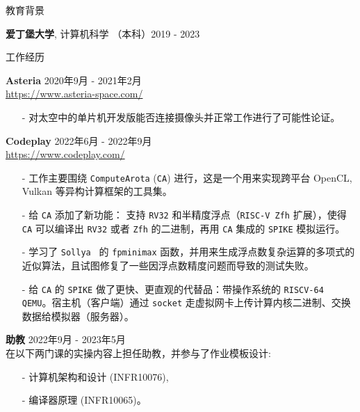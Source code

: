\documentclass{resume} %
\newcommand{\itemsepval}{-6pt}
\newcommand{\code}{\texttt}
\begin{document}
\begin{rSection}{教育背景}

{\bf  爱丁堡大学}, 计算机科学 （本科）\hfill {2019 - 2023}

\end{rSection}

\begin{rSection}{工作经历}

    \textbf{Asteria} \hfill 2020年9月 - 2021年2月  \\
    \url{https://www.asteria-space.com/} \hfill \par
    \begin{itemize}
        \itemsep \itemsepval {} 
        \item[-] 对太空中的单片机开发版能否连接摄像头并正常工作进行了可能性论证。
    \end{itemize}
     
    \textbf{Codeplay} \hfill 2022年6月 - 2022年9月 \\
    \url{https://www.codeplay.com/} \hfill \par
    \begin{itemize}
        \itemsep \itemsepval {} 
        \item[-] 工作主要围绕 \code{ComputeArota} (\code{CA}) 进行，这是一个用来实现跨平台 OpenCL, Vulkan 等异构计算框架的工具集。
        \item[-] 给 \code{CA} 添加了新功能： 支持 \code{RV32} 和半精度浮点（\code{RISC-V Zfh} 扩展），使得 \code{CA} 可以编译出 \code{RV32} 或者 \code{Zfh} 的二进制，再用 \code{CA} 集成的 \code{SPIKE} 模拟运行。
        \item[-] 学习了 \code{Sollya } 的 \code{fpminimax} 函数，并用来生成浮点数复杂运算的多项式的近似算法，且试图修复了一些因浮点数精度问题而导致的测试失败。
        \item[-] 给 \code{CA} 的 \code{SPIKE} 做了更快、更直观的代替品：带操作系统的 \code{RISCV-64 QEMU}。宿主机（客户端）通过 \code{socket} 走虚拟网卡上传计算内核二进制、交换数据给模拟器（服务器）。
    \end{itemize}
      
    \textbf{助教} \hfill 2022年9月 - 2023年5月     \\
    在以下两门课的实操内容上担任助教，并参与了作业模板设计: \hfill \par
    \begin{itemize}
        \itemsep \itemsepval {} 
        \item[-] 计算机架构和设计 (INFR10076), 
        \item[-] 编译器原理 (INFR10065)。
    \end{itemize}


\end{rSection} 
\end{document}
